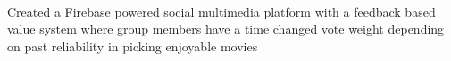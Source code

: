 \documentclass[letterpaper, article]{deedy-resume-openfont}
\begin{document}
\begin{minipage}[t]{0.66\textwidth}
\\
\begin{tightemize}
	\item Created a Firebase powered social multimedia platform with a feedback based value system where group members have a time changed vote weight depending on past reliability in picking enjoyable movies
\end{tightemize}



%
%


\end{minipage} 
\end{document}
